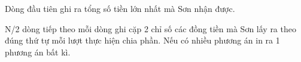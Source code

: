 Dòng đầu tiên ghi ra tổng số tiền lớn nhất mà Sơn nhận được.

N/2 dòng tiếp theo mỗi dòng ghi cặp 2 chỉ số các đồng tiền mà Sơn lấy ra theo đúng thứ tự mỗi lượt thực hiện chia phần. Nếu có nhiều phương án in ra 1 phương án bất kì.